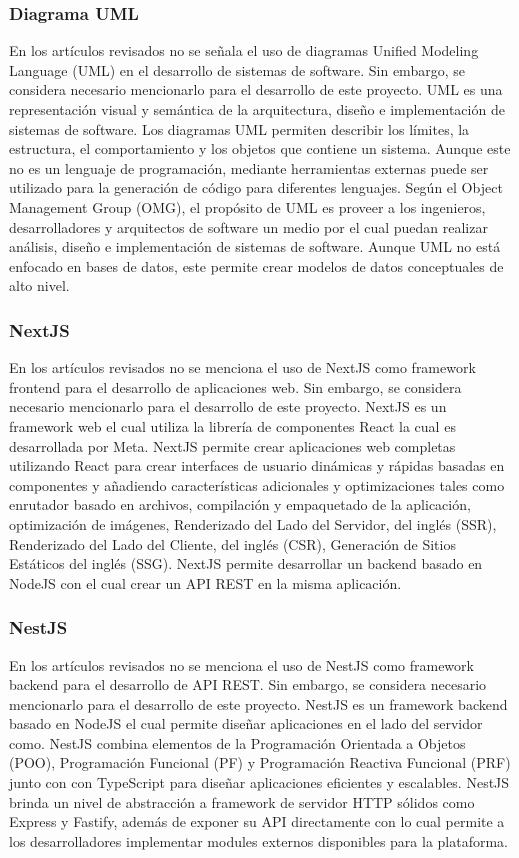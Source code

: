 \subsubsection{Diagrama UML}
En los artículos revisados no se señala el uso de diagramas Unified Modeling Language (UML) en el desarrollo de sistemas
de software. Sin embargo, se considera necesario mencionarlo para el desarrollo de este proyecto. UML es una
representación visual y semántica de la arquitectura, diseño e implementación de sistemas de software. Los diagramas
UML permiten describir los límites, la estructura, el comportamiento y los objetos que contiene un sistema. Aunque este
no es un lenguaje de programación, mediante herramientas externas puede ser utilizado para la generación de código para
diferentes lenguajes. Según el Object Management Group (OMG), el propósito de UML es proveer a los ingenieros,
desarrolladores y arquitectos de software un medio por el cual puedan realizar análisis, diseño e implementación de
sistemas de software. Aunque UML no está enfocado en bases de datos, este permite crear modelos de datos conceptuales
de alto nivel.

\subsubsection{NextJS}
En los artículos revisados no se menciona el uso de NextJS como framework frontend para el desarrollo de aplicaciones web.
Sin embargo, se considera necesario mencionarlo para el desarrollo de este proyecto. NextJS es un framework web el cual
utiliza la librería de componentes React la cual es desarrollada por Meta. NextJS permite crear aplicaciones web
completas utilizando React para crear interfaces de usuario dinámicas y rápidas basadas en componentes y añadiendo
características adicionales y optimizaciones tales como enrutador basado en archivos, compilación y empaquetado de la
aplicación, optimización de imágenes, Renderizado del Lado del Servidor, del inglés (SSR), Renderizado del Lado del Cliente, del inglés (CSR),
Generación de Sitios Estáticos del inglés (SSG). NextJS permite desarrollar un backend basado en NodeJS con el cual crear un API
REST en la misma aplicación.

\subsubsection{NestJS}
En los artículos revisados no se menciona el uso de NestJS como framework backend para el desarrollo de API REST.
Sin embargo, se considera necesario mencionarlo para el desarrollo de este proyecto. NestJS es un framework backend
basado en NodeJS el cual permite diseñar aplicaciones en el lado del servidor como. NestJS combina elementos de la
Programación Orientada a Objetos (POO), Programación Funcional (PF) y Programación Reactiva Funcional (PRF) junto con con
TypeScript para diseñar aplicaciones eficientes y escalables. NestJS brinda un nivel de abstracción a framework de
servidor HTTP sólidos como Express y Fastify, además de exponer su API directamente con lo cual permite a los
desarrolladores implementar modules externos disponibles para la plataforma.

